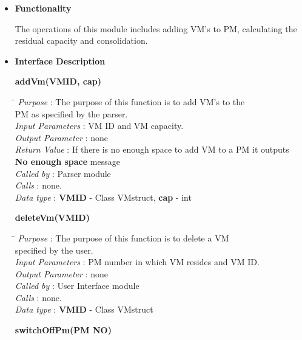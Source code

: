 \documentclass[a4paper,11pt]{article}
\begin{document}
\begin{itemize}
\item \textbf{Functionality}

The operations of this module includes adding VM's to PM, calculating the residual capacity and consolidation.

\item \textbf{Interface Description}


\textbf{addVm(VM\textunderscore ID, cap)}
  
\begin{tabbing}
\hspace*{3.2cm}\= \kill
 \textit{Purpose} \> : The purpose of this function is to add VM's to the \\ \>PM as specified by the parser.\\
  \textit{Input Parameters} \> : VM ID and VM capacity. \\
  \textit{Output Parameter} \> : none \\
  \textit{Return Value} \> : If there is no enough space to add VM to a PM it outputs \\ \>\textbf{No enough space} message\\
  \textit{Called by} \> : Parser module \\
  \textit{Calls} \> : none.\\
  \textit{Data type} \> : \textbf{VM\textunderscore ID} - Class VMstruct, \textbf{cap} - int
\end{tabbing}

\textbf{deleteVm(VM\textunderscore ID)}
  
\begin{tabbing}
\hspace*{3.2cm}\= \kill
 \textit{Purpose} \> : The purpose of this function is to delete a VM\\ \> specified by the user.\\
  \textit{Input Parameters} \> : PM number in which VM resides and VM ID. \\
  \textit{Output Parameter} \> : none \\
 \textit{Called by} \> : User Interface module \\
  \textit{Calls} \> : none.\\
  \textit{Data type} \> : \textbf{VM\textunderscore ID} - Class VMstruct
\end{tabbing}
\textbf{switchOffPm(PM \textunderscore NO)}
  

\end{itemize}
\end{document}
